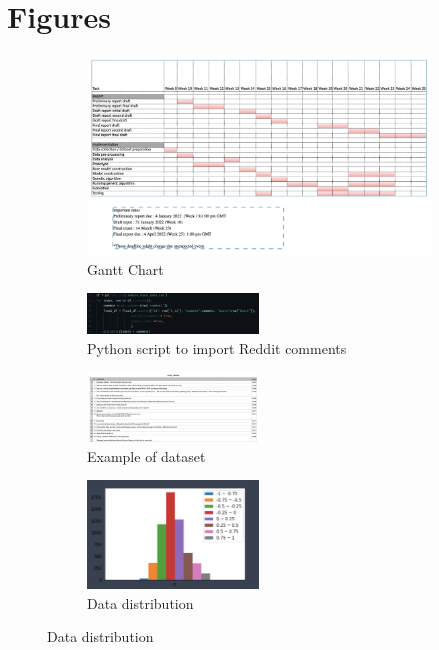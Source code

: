 \documentclass[11pt, natbib=false]{article}
\begin{document}
\section{Figures}
\begin{figure}[h!]
  \centering
  \begin{subfigure}[b]{0.7\linewidth}
    \caption{Gantt Chart}
    \includegraphics[width=\linewidth]{./gantt.png}
  \end{subfigure}

  \begin{subfigure}[b]{1.0\linewidth}
  \centering
  \caption{Python script to import Reddit comments}
  \includegraphics[width=0.5\textwidth]{./code.png}
  \end{subfigure}

  \begin{subfigure}[b]{1.0\linewidth}
  \centering
  \caption{Example of dataset}
  \includegraphics[width=0.5\textwidth]{./data_example.png}
  \end{subfigure}

  \begin{subfigure}[b]{1.0\linewidth}
  \centering
  \caption{Data distribution}
  \includegraphics[width=0.5\textwidth]{./Data_distribution.png}
  \end{subfigure}
\end{figure}
\end{document}
